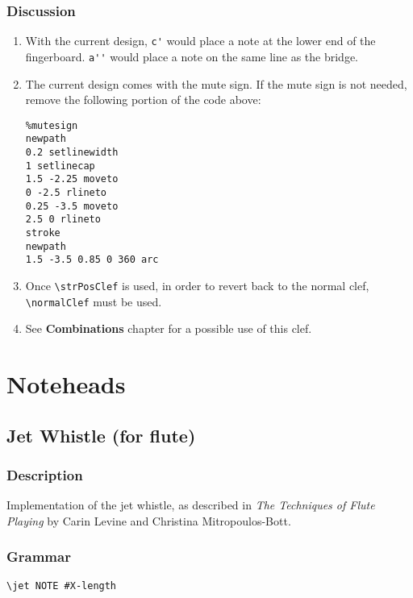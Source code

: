 \documentclass[11pt, oneside]{book}   	%
\begin{document}
\subsection{Discussion}
\begin{enumerate}
\item With the current design, \verb|c'| would place a note at the lower end of the fingerboard. \verb|a''| would place a note on the same line as the bridge. 

\item The current design comes with the mute sign. If the mute sign is not needed, remove the following portion of the code above:

\begin{verbatim}
%mutesign
newpath
0.2 setlinewidth
1 setlinecap
1.5 -2.25 moveto
0 -2.5 rlineto
0.25 -3.5 moveto
2.5 0 rlineto
stroke
newpath
1.5 -3.5 0.85 0 360 arc
\end{verbatim}

\item Once \verb|\strPosClef| is used, in order to revert back to the normal clef, \verb|\normalClef| must be used.
\item See \textbf{Combinations} chapter for a possible use of this clef.
\end{enumerate}





\chapter {Noteheads}



\section {Jet Whistle (for flute)}
\hfill

\subsection{Description}
Implementation of the jet whistle, as described in \textit{The Techniques of Flute Playing} by Carin Levine and Christina Mitropoulos-Bott.\autocite[18]{RN1695} 

\subsection{Grammar}
\begin{verbatim}
\jet NOTE #X-length
\end{verbatim}
\end{document}
